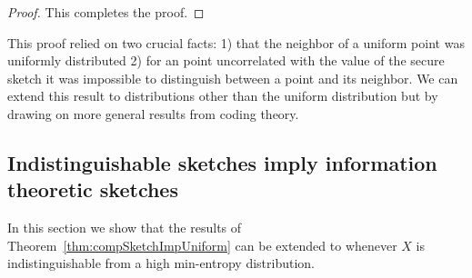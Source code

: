 \documentclass[11pt]{article}
\newcommand{\thref}[1]{\mbox{Theorem~\ref{#1}}}
\newcommand{\class}[1]{{\ensuremath{\mathsf{#1}}}}
\newcommand{\sketch}{\ensuremath{\class{SS}}\xspace}
\newcommand{\rec}{\ensuremath{\class{Rec}}\xspace}
\newcommand{\sample}{\ensuremath{\class{Sample}}\xspace}
\newcommand{\ngl}{\ensuremath{\mathtt{ngl}}\xspace}
\begin{document}
{\begin{proof}
This completes the proof.
\end{proof}

This proof relied on two crucial facts: 1) that the neighbor of a uniform point was uniformly distributed 2) for an point uncorrelated with the value of the secure sketch it was impossible to distinguish between a point and its neighbor.  We can extend this result to distributions other than the uniform distribution but by drawing on more general results from coding theory.  

\subsection{Indistinguishable sketches imply information theoretic sketches}
In this section we show that the results of \thref{thm:compSketchImpUniform} can be extended to whenever $X$ is indistinguishable from a high min-entropy distribution.  }
\end{document}
